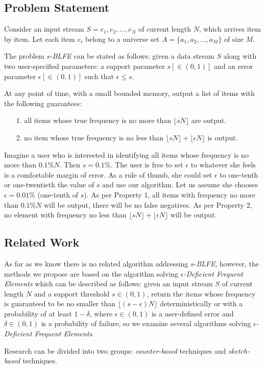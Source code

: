 \documentclass[conference]{IEEEtran}
\begin{document}
\subsection{Problem Statement}
Consider an input stream $S = e_1,e_2,..., e_N$ of current length $N$, which arrives item by item. Let each item $e_i$ belong to a universe set $A=\{a_1,a_2,...,a_M\}$ of size $M$.\par
The problem $s$-\emph{BLFE} can be stated as follows: given a data stream $S$ along with two user-specified parameters: a support parameter $s[\in (0,1)]$ and an error parameter $\epsilon[\in (0,1)]$ such that $\epsilon\leq s$.\par
At any point of time, with a small bounded memory, output a list of items with the following guarantees: 
\begin{enumerate}
\item[1.] all items whose true frequency is no more than $\lfloor sN\rfloor$ are output.
\item[2.] no item whose true frequency is no less than $\lfloor sN\rfloor+\lfloor\epsilon N\rfloor$ is output.
\end{enumerate}\par
Imagine a user who is interested in identifying all items whose frequency is no more than $0.1\%N$. Then $s=0.1\%$. The user is free to set $\epsilon$ to whatever she feels is a comfortable margin of error. As a rule of thumb, she could set $\epsilon$ to one-tenth or one-twentieth the value of $s$ and use our algorithm. Let us assume she chooses $\epsilon=0.01\%$ (one-tenth of $s$). As per Property 1, all items with frequency no more than  $0.1\%N$ will be output, there will be no false negatives. As per Property 2, no element with frequency no less than $\lfloor sN\rfloor+\lfloor\epsilon N\rfloor$ will be output.\par

\subsection{Related Work}
As far as we know there is no related algorithm addressing $s$-\emph{BLFE}, however, the methods we propose are based on the algorithm solving $\epsilon$\emph{-Deficient Frequent Elements} which can be described as follows: given an input stream $S$ of current length $N$ and a support threshold $s\in(0,1)$, return the items whose frequency is guaranteed to be no smaller than $\lfloor(s-\epsilon)N\rfloor$ deterministically or with a probability of at least $1-\delta$, where $\epsilon\in(0,1)$ is a user-defined error and $\delta\in(0,1)$ is a probability of failure, so we examine several algorithms solving $\epsilon$\emph{-Deficient Frequent Elements}.\par
Research can be divided into two groups: \emph{counter-based} techniques and \emph{sketch-based} techniques.\par
\end{document}
